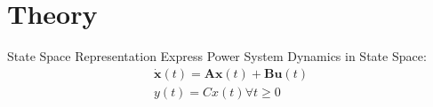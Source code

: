 \section[Theory]{Theory}
\label{sec:lasso_theory}

\begin{frame}[fragile]{State Space Representation}
	Express Power System Dynamics in State Space:
	\begin{equation}
		\label{eq:ssr}
		\begin{split}
			\dot{\textbf{x}}(t) = \textbf{A}\textbf{x}(t)
			+ \textbf{B}\textbf{u}(t)\\
			y(t) = Cx(t) \forall t\geq0
		\end{split}
		
		
	\end{equation}
\end{frame}